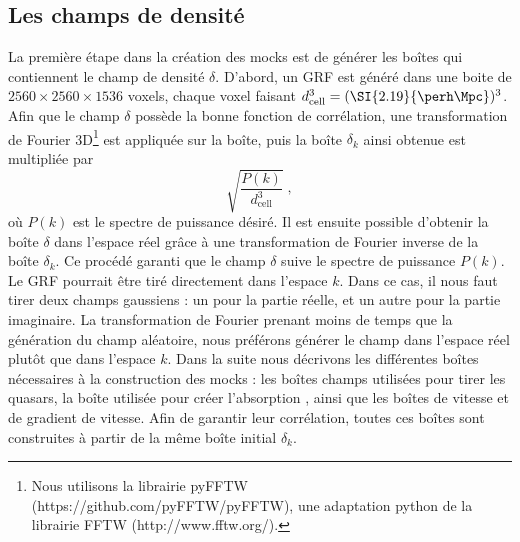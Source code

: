 \subsection{Les champs de densité}
\label{subsec:densityfields}
La première étape dans la création des mocks est de générer les boîtes qui contiennent le champ de densité $\delta$. D'abord, un GRF est généré dans une boite de $\num{2560}\times\num{2560}\times\num{1536}$ voxels, chaque voxel faisant  $d_{\mathrm{cell}}^3 = (\SI{2.19}{\perh\Mpc})^3$.
Afin que le champ $\delta$ possède la bonne fonction de corrélation, une transformation de Fourier 3D\footnote{Nous utilisons la librairie pyFFTW (https://github.com/pyFFTW/pyFFTW), une adaptation python de la librairie FFTW (http://www.fftw.org/).} est appliquée sur la boîte, puis la boîte $\delta_k$ ainsi obtenue est multipliée par
\begin{equation}
  \sqrt{\frac{P(k)}{d_{\mathrm{cell}}^3}} \; ,
\end{equation}
où $P(k)$ est le spectre de puissance désiré. Il est ensuite possible d'obtenir la boîte $\delta$ dans l'espace réel grâce à une transformation de Fourier inverse de la boîte $\delta_k$. Ce procédé garanti que le champ $\delta$ suive le spectre de puissance $P(k)$. 
Le GRF pourrait être tiré directement dans l'espace $k$. Dans ce cas, il nous faut tirer deux champs gaussiens : un pour la partie réelle, et un autre pour la partie imaginaire. La transformation de Fourier prenant moins de temps que la génération du champ aléatoire, nous préférons générer le champ dans l'espace réel plutôt que dans l'espace $k$.
Dans la suite nous décrivons les différentes boîtes nécessaires à la construction des mocks : les boîtes champs utilisées pour tirer les quasars, la boîte utilisée pour créer l'absorption \lya{}, ainsi que les boîtes de vitesse et de gradient de vitesse. Afin de garantir leur corrélation, toutes ces boîtes sont construites à partir de la même boîte initial $\delta_k$.


